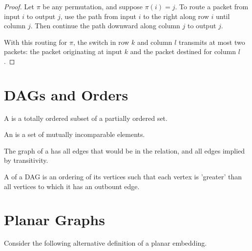 \documentclass[quiz]{mcs}
\begin{document}
\begin{proof} 
  Let $\pi$ be any permutation, and suppose $\pi(i)=j$.  To route a packet 
  from input $i$ to output $j$, use the path from input $i$ to the right 
  along row $i$ until column $j$.  Then continue the path downward along 
  column $j$ to output $j$. 
 
  With this routing for $\pi$, the switch in row $k$ and column $l$ 
  transmits at most two packets: the packet originating at input $k$ and 
  the packet destined for column $l$. 
\end{proof} 

\section{DAGs and Orders}

A  is a totally ordered subset of a partially ordered set.

An  is a set of mutually incomparable elements.

The graph of a  has all edges that would
      be in the relation, and all edges implied by transitivity.

A  of a DAG is an ordering of its vertices
      such that each vertex is 'greater' than all vertices to which it has
      an outbount edge.
\fi

\section{Planar Graphs}
Consider the following alternative definition of a planar embedding.
\end{document}
